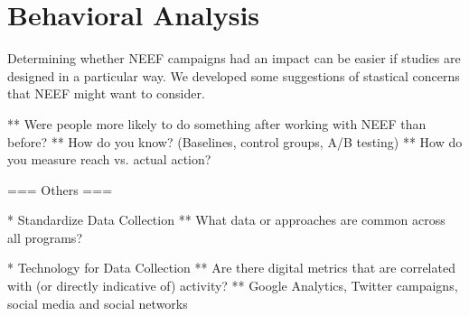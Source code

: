 \documentclass{article}
\begin{document}
\section{Behavioral Analysis}
Determining whether NEEF campaigns had an impact
can be easier if studies are designed in a particular way.
We developed some suggestions of stastical concerns that
NEEF might want to consider.

** Were people more likely to do something after working with NEEF than before?
** How do you know?  (Baselines, control groups, A/B testing)
** How do you measure reach vs. actual action?

=== Others ===

* Standardize Data Collection
** What data or approaches are common across all programs?

* Technology for Data Collection
** Are there digital metrics that are correlated with (or directly indicative of) activity? 
** Google Analytics, Twitter campaigns, social media and social networks
\end{document}
